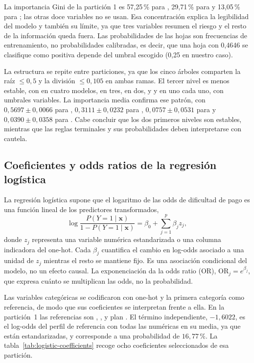 La importancia Gini de la partición 1 es 57,25\,\% para , 29,71\,\% para  y 13,05\,\% para ; las otras doce variables no se usan. Esa concentración explica la legibilidad del modelo y también su límite, ya que tres variables resumen el riesgo y el resto de la información queda fuera. Las probabilidades de las hojas son frecuencias de entrenamiento, no probabilidades calibradas, es decir, que una hoja con 0,4646 se clasifique como positiva depende del umbral escogido (0,25 en nuestro caso).

La estructura se repite entre particiones, ya que los cinco árboles comparten la raíz  $\le 0{,}5$ y la división  $\le 0{,}105$ en ambas ramas. El tercer nivel es menos estable, con  en cuatro modelos,  en tres,  en dos, y  y  en uno cada uno, con umbrales variables. La importancia media confirma ese patrón, con $0{,}5697 \pm 0{,}0066$ para , $0{,}3111 \pm 0{,}0232$ para , $0{,}0757 \pm 0{,}0531$ para  y $0{,}0390 \pm 0{,}0358$ para . Cabe concluir que los dos primeros niveles son estables, mientras que las reglas terminales y sus probabilidades deben interpretarse con cautela.

\subsection{Coeficientes y odds ratios de la regresión logística}

La regresión logística supone que el logaritmo de las odds de dificultad de pago es una función lineal de los predictores transformados,
\[
\log\frac{P(Y=1\mid \mathbf{x})}{1-P(Y=1\mid \mathbf{x})}
= \beta_0 + \sum_{j=1}^{p}\beta_j z_j,
\]
donde $z_j$ representa una variable numérica estandarizada o una columna indicadora del one-hot. Cada $\beta_j$ cuantifica el cambio en log-odds asociado a una unidad de $z_j$ mientras el resto se mantiene fijo. Es una asociación condicional del modelo, no un efecto causal. La exponenciación da la odds ratio (OR), $\mathrm{OR}_j=e^{\beta_j}$, que expresa cuánto se multiplican las odds, no la probabilidad.

Las variables categóricas se codificaron con one-hot y la primera categoría como referencia, de modo que sus coeficientes se interpretan frente a ella. En la partición~1 las referencias son , ,  y plan . El término independiente, $-1{,}6022$, es el log-odds del perfil de referencia con todas las numéricas en su media, ya que están estandarizadas, y corresponde a una probabilidad de $16{,}77$\,\%. La tabla~\ref{tab:logistic-coefficients} recoge ocho coeficientes seleccionados de esa partición.

